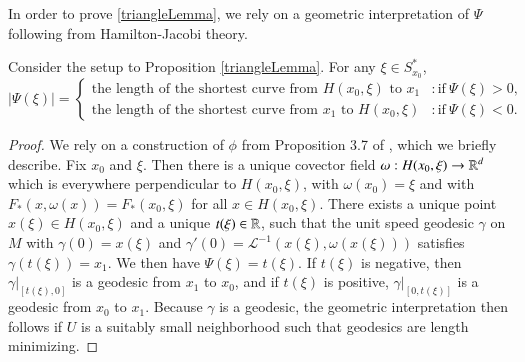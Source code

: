 

In order to prove \ref{triangleLemma}, we rely on a geometric interpretation of $\Psi$ following from Hamilton-Jacobi theory.

\begin{lemma} \label{HamiltonLemma}
    Consider the setup to Proposition \ref{triangleLemma}. For any $\xi \in S_{x_0}^*$,
    \[ |\Psi(\xi)| = \begin{cases} \text{the length of the shortest curve from $H(x_0,\xi)$ to $x_1$} & : \text{if}\ \Psi(\xi) > 0, \\ \text{the length of the shortest curve from $x_1$ to $H(x_0,\xi)$} & : \text{if}\ \Psi(\xi) < 0. \end{cases} \]
\end{lemma}
\begin{proof}
    We rely on a construction of $\phi$ from Proposition 3.7 of \cite{Treves2}, which we briefly describe. Fix $x_0$ and $\xi$. Then there is a unique covector field $\omega: H(x_0,\xi) \to \operatorname{\mathbb{R}}^d$ which is everywhere perpendicular to $H(x_0,\xi)$, with $\omega(x_0) = \xi$ and with $F_*(x,\omega(x)) = F_*(x_0,\xi)$ for all $x \in H(x_0,\xi)$. There exists a unique point $x(\xi) \in H(x_0,\xi)$ and a unique $t(\xi) \in \operatorname{\mathbb{R}}$, such that the unit speed geodesic $\gamma$ on $M$ with $\gamma(0) = x(\xi)$ and $\gamma'(0) = \mathcal{L}^{-1}( x(\xi), \omega(x(\xi)) )$ satisfies $\gamma( t(\xi) ) = x_1$. We then have $\Psi(\xi) = t(\xi)$. If $t(\xi)$ is negative, then $\gamma|_{[t(\xi),0]}$ is a geodesic from $x_1$ to $x_0$, and if $t(\xi)$ is positive, $\gamma|_{[0,t(\xi)]}$ is a geodesic from $x_0$ to $x_1$. Because $\gamma$ is a geodesic, the geometric interpretation then follows if $U$ is a suitably small neighborhood such that geodesics are length minimizing.
\end{proof}

